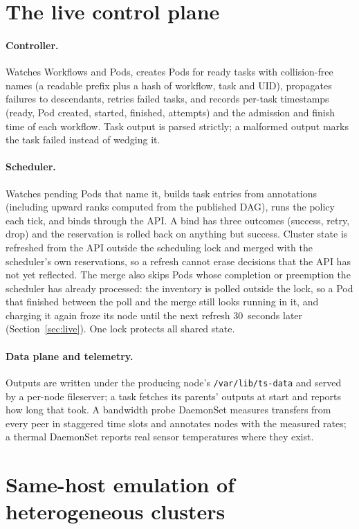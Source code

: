 \documentclass[12pt,a4paper]{report}
\begin{document}
\section{The live control plane}

\paragraph{Controller.} Watches Workflows and Pods, creates Pods for ready
tasks with collision-free names (a readable prefix plus a hash of
workflow, task and UID), propagates failures to descendants, retries
failed tasks, and records per-task timestamps (ready, Pod created, started,
finished, attempts) and the admission and finish time of each workflow.
Task output is parsed strictly; a malformed output marks the task failed
instead of wedging it.

\paragraph{Scheduler.} Watches pending Pods that name it, builds task
entries from annotations (including upward ranks computed from the
published DAG), runs the policy each tick, and binds through the API. A
bind has three outcomes (success, retry, drop) and the reservation is
rolled back on anything but success. Cluster state is refreshed from the
API outside the scheduling lock and merged with the scheduler's own
reservations, so a refresh cannot erase decisions that the API has not
yet reflected. The merge also skips Pods whose completion or preemption
the scheduler has already processed: the inventory is polled outside the
lock, so a Pod that finished between the poll and the merge still looks
running in it, and charging it again froze its node until the next
refresh 30~seconds later (Section~\ref{sec:live}). One lock protects all
shared state.

\paragraph{Data plane and telemetry.} Outputs are written under the
producing node's \texttt{/var/lib/ts-data} and served by a per-node
fileserver; a task fetches its parents' outputs at start and reports how
long that took. A bandwidth probe DaemonSet measures transfers from every
peer in staggered time slots and annotates nodes with the measured rates;
a thermal DaemonSet reports real sensor temperatures where they exist.

\section{Same-host emulation of heterogeneous clusters}
\label{sec:emulation}
\end{document}
